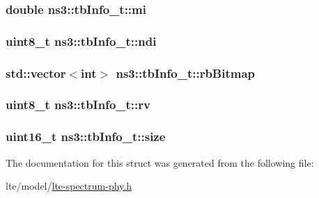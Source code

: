 \subsubsection[{\texorpdfstring{mi}{mi}}]{\setlength{\rightskip}{0pt plus 5cm}double ns3\+::tb\+Info\+\_\+t\+::mi}\hypertarget{structns3_1_1tbInfo__t_ac60e6cd14190328b509222882714641d}{}\label{structns3_1_1tbInfo__t_ac60e6cd14190328b509222882714641d}
\subsubsection[{\texorpdfstring{ndi}{ndi}}]{\setlength{\rightskip}{0pt plus 5cm}uint8\+\_\+t ns3\+::tb\+Info\+\_\+t\+::ndi}\hypertarget{structns3_1_1tbInfo__t_af2782f4af557c0c3b6b091c08e906a17}{}\label{structns3_1_1tbInfo__t_af2782f4af557c0c3b6b091c08e906a17}
\subsubsection[{\texorpdfstring{rb\+Bitmap}{rbBitmap}}]{\setlength{\rightskip}{0pt plus 5cm}std\+::vector$<$int$>$ ns3\+::tb\+Info\+\_\+t\+::rb\+Bitmap}\hypertarget{structns3_1_1tbInfo__t_a80d554aa1ee4eb855236a0560a8b00f3}{}\label{structns3_1_1tbInfo__t_a80d554aa1ee4eb855236a0560a8b00f3}
\subsubsection[{\texorpdfstring{rv}{rv}}]{\setlength{\rightskip}{0pt plus 5cm}uint8\+\_\+t ns3\+::tb\+Info\+\_\+t\+::rv}\hypertarget{structns3_1_1tbInfo__t_a86ba824881f63c3d230f7f5de7bc5cc6}{}\label{structns3_1_1tbInfo__t_a86ba824881f63c3d230f7f5de7bc5cc6}
\subsubsection[{\texorpdfstring{size}{size}}]{\setlength{\rightskip}{0pt plus 5cm}uint16\+\_\+t ns3\+::tb\+Info\+\_\+t\+::size}\hypertarget{structns3_1_1tbInfo__t_adc37f4eaa0fc3c51627cff0c4137d254}{}\label{structns3_1_1tbInfo__t_adc37f4eaa0fc3c51627cff0c4137d254}


The documentation for this struct was generated from the following file\+:\begin{DoxyCompactItemize}
\item 
lte/model/\hyperlink{lte-spectrum-phy_8h}{lte-\/spectrum-\/phy.\+h}\end{DoxyCompactItemize}
